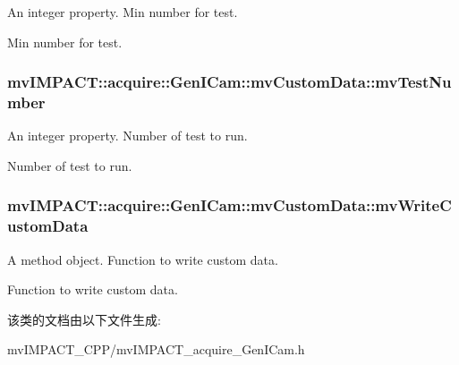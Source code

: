 An integer property. Min number for test. 

Min number for test. \hypertarget{classmv_i_m_p_a_c_t_1_1acquire_1_1_gen_i_cam_1_1mv_custom_data_adf62e01c9c4f54ddb61249cb6168d328}{
\subsubsection[{mv\+Test\+Number}]{ mv\+I\+M\+P\+A\+C\+T\+::acquire\+::\+Gen\+I\+Cam\+::mv\+Custom\+Data\+::mv\+Test\+Number}}\label{classmv_i_m_p_a_c_t_1_1acquire_1_1_gen_i_cam_1_1mv_custom_data_adf62e01c9c4f54ddb61249cb6168d328}


An integer property. Number of test to run. 

Number of test to run. \hypertarget{classmv_i_m_p_a_c_t_1_1acquire_1_1_gen_i_cam_1_1mv_custom_data_ad1b5ff8323b05b7e0c9a61bb5ca18059}{
\subsubsection[{mv\+Write\+Custom\+Data}]{ mv\+I\+M\+P\+A\+C\+T\+::acquire\+::\+Gen\+I\+Cam\+::mv\+Custom\+Data\+::mv\+Write\+Custom\+Data}}\label{classmv_i_m_p_a_c_t_1_1acquire_1_1_gen_i_cam_1_1mv_custom_data_ad1b5ff8323b05b7e0c9a61bb5ca18059}


A method object. Function to write custom data. 

Function to write custom data. 

该类的文档由以下文件生成\+:\begin{DoxyCompactItemize}
\item 
mv\+I\+M\+P\+A\+C\+T\+\_\+\+C\+P\+P/mv\+I\+M\+P\+A\+C\+T\+\_\+acquire\+\_\+\+Gen\+I\+Cam.\+h\end{DoxyCompactItemize}

